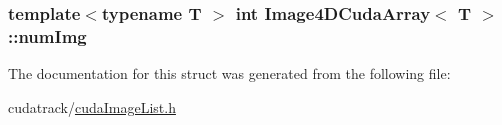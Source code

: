 \subsubsection[{\texorpdfstring{num\+Img}{numImg}}]{\setlength{\rightskip}{0pt plus 5cm}template$<$typename T $>$ int {\bf Image4\+D\+Cuda\+Array}$<$ T $>$\+::num\+Img}\hypertarget{struct_image4_d_cuda_array_acc1ba710635bc84af3d3032b7a38dea3}{}\label{struct_image4_d_cuda_array_acc1ba710635bc84af3d3032b7a38dea3}


The documentation for this struct was generated from the following file\+:\begin{DoxyCompactItemize}
\item 
cudatrack/\hyperlink{cuda_image_list_8h}{cuda\+Image\+List.\+h}\end{DoxyCompactItemize}
